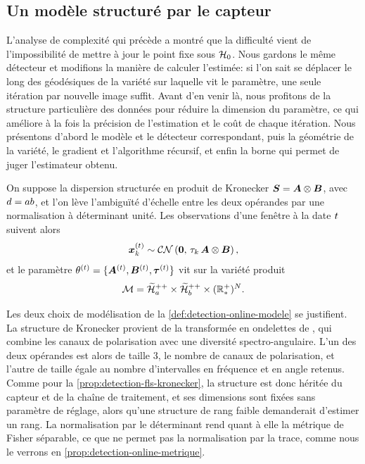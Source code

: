 \subsection{Un modèle structuré par le capteur}
\label{subsec:detection-online-riemann}

L'analyse de complexité qui précède a montré que la difficulté vient de l'impossibilité de mettre à jour le point fixe sous $\mathcal{H}_0$. Nous gardons le même détecteur et modifions la manière de calculer l'estimée: si l'on sait se déplacer le long des géodésiques de la variété sur laquelle vit le paramètre, une seule itération par nouvelle image suffit. Avant d'en venir là, nous profitons de la structure particulière des données pour réduire la dimension du paramètre, ce qui améliore à la fois la précision de l'estimation et le coût de chaque itération. Nous présentons d'abord le modèle et le détecteur correspondant, puis la géométrie de la variété, le gradient et l'algorithme récursif, et enfin la borne qui permet de juger l'estimateur obtenu.

\begin{definition}
\label{def:detection-online-modele}
  On suppose la dispersion structurée en produit de Kronecker $\boldsymbol{S} = \boldsymbol{A}\otimes\boldsymbol{B}$, avec $d=ab$, et l'on lève l'ambiguïté d'échelle entre les deux opérandes par une normalisation à déterminant unité. Les observations d'une fenêtre à la date $t$ suivent alors
  \begin{equation}
    \boldsymbol{x}_k^{(t)} \sim \mathcal{CN}\left(\boldsymbol{0},\,\tau_k\,\boldsymbol{A}\otimes\boldsymbol{B}\right),
    \label{eq:detection-online-modele}
  \end{equation}
  et le paramètre $\theta^{(t)}=\{\boldsymbol{A}^{(t)},\boldsymbol{B}^{(t)},\boldsymbol{\tau}^{(t)}\}$ vit sur la variété produit
  \begin{equation}
    \mathcal{M} = \widetilde{\mathcal{H}}_{a}^{++}\times\widetilde{\mathcal{H}}_{b}^{++}\times(\mathbb{R}_*^+)^{N}.
    \label{eq:detection-online-variete}
  \end{equation}
\end{definition}

Les deux choix de modélisation de la \cref{def:detection-online-modele} se justifient. La structure de Kronecker provient de la transformée en ondelettes de \cite{Mian_wavelet_2019}, qui combine les canaux de polarisation avec une diversité spectro-angulaire. L'un des deux opérandes est alors de taille $3$, le nombre de canaux de polarisation, et l'autre de taille égale au nombre d'intervalles en fréquence et en angle retenus. Comme pour la \cref{prop:detection-fls-kronecker}, la structure est donc héritée du capteur et de la chaîne de traitement, et ses dimensions sont fixées sans paramètre de réglage, alors qu'une structure de rang faible demanderait d'estimer un rang. La normalisation par le déterminant rend quant à elle la métrique de Fisher séparable, ce que ne permet pas la normalisation par la trace, comme nous le verrons en \cref{prop:detection-online-metrique}.

